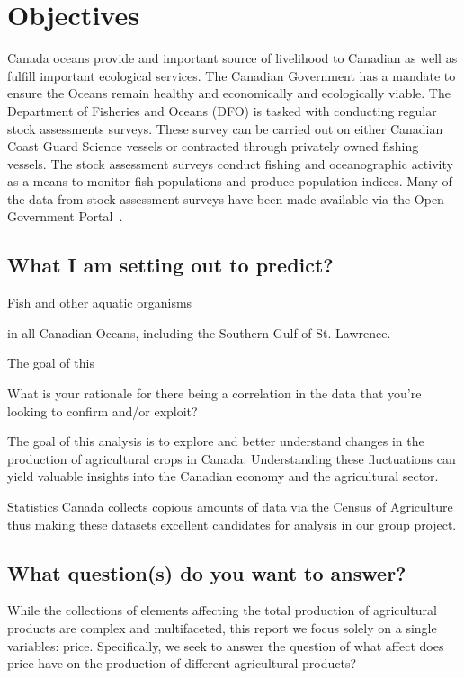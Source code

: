 \section{Objectives}

Canada oceans provide and important source of livelihood to Canadian as well as fulfill important ecological services.
The Canadian Government has a mandate to ensure the Oceans remain healthy and economically and ecologically viable.
The Department of Fisheries and Oceans (DFO) is tasked with conducting regular stock assessments surveys.
These survey can be carried out on either Canadian Coast Guard Science vessels or contracted through privately owned fishing vessels.
The stock assessment surveys conduct fishing and oceanographic activity as a means to monitor fish populations and produce population indices.
Many of the data from stock assessment surveys have been made available via the Open Government Portal~\cite{ogp}.


\subsection{What I am setting out to predict?}

Fish and other aquatic organisms


in all Canadian Oceans, including the Southern Gulf of St. Lawrence.



The goal of this

 What is your rationale for there being a correlation in the data that you’re looking to confirm and/or exploit?


The goal of this analysis is to explore and better understand changes in the production of agricultural crops in Canada.
Understanding these fluctuations can yield valuable insights into the Canadian economy and the agricultural sector.

Statistics Canada collects copious amounts of data via the Census of Agriculture~\cite{census} thus making these datasets excellent candidates for analysis in our group project.

\subsection{What question(s) do you want to answer?}

While the collections of elements affecting the total production of agricultural products are complex and multifaceted, this report we focus solely on a single variables: price.
Specifically, we seek to answer the question of what affect does price have on the production of different agricultural products?

